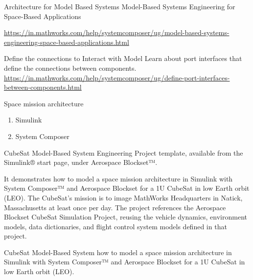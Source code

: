 \begin{frame}
\begin{block}{Architecture for Model Based Systems}
 Model-Based Systems Engineering for Space-Based Applications 
 
\url{https://in.mathworks.com/help/systemcomposer/ug/model-based-systems-engineering-space-based-applications.html}
\end{block}
\end{frame}

\begin{frame}
\begin{block}{Define the connections to Interact with Model }
Learn about port interfaces that define the connections between components. \\
\url{https://in.mathworks.com/help/systemcomposer/ug/define-port-interfaces-between-components.html}
\end{block}
\end{frame}



\begin{frame}
\begin{block}{Space mission architecture }

\begin{enumerate}
    \item  Simulink
    \item  System Composer
\end{enumerate}

 CubeSat Model-Based System Engineering Project template, available from the Simulink® start page, under Aerospace Blockset™. 
 
 It demonstrates how to model a space mission architecture in Simulink with System Composer™ and Aerospace Blockset for a 1U CubeSat in low Earth orbit (LEO). The CubeSat's mission is to image MathWorks Headquarters in Natick, Massachusetts at least once per day. The project references the Aerospace Blockset CubeSat Simulation Project, reusing the vehicle dynamics, environment models, data dictionaries, and flight control system models defined in that project.
\end{block}
\end{frame}


\begin{frame}
\begin{block}{ CubeSat Model-Based System}
 how to model a space mission architecture in Simulink with System Composer™ and Aerospace Blockset for a 1U CubeSat in low Earth orbit (LEO).  
\end{block}
\end{frame}

